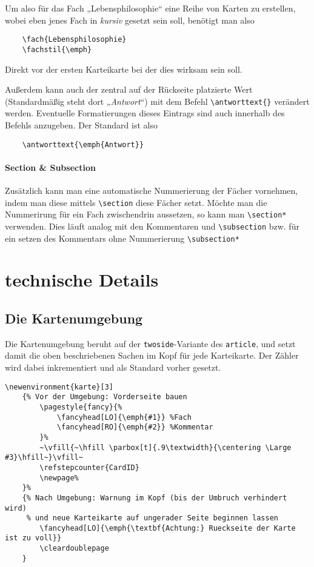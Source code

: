 \documentclass[a4paper]{article}
\begin{document}
Um also für das Fach „Lebensphilosophie“ eine Reihe von Karten zu erstellen, wobei eben jenes Fach in \emph{kursiv} gesetzt sein soll, benötigt man also
\begin{lstlisting}
	\fach{Lebensphilosophie}
	\fachstil{\emph}
\end{lstlisting}
Direkt vor der ersten Karteikarte bei der dies wirksam sein soll.

Außerdem kann auch der zentral auf der Rückseite platzierte Wert (Standardmäßig steht dort „\emph{Antwort}“) mit dem Befehl \lstinline!\antworttext{}! verändert werden. Eventuelle Formatierungen dieses Eintrags sind auch innerhalb des Befehls anzugeben. Der Standard ist also
\begin{lstlisting}
	\antworttext{\emph{Antwort}}
\end{lstlisting}

\paragraph{Section \& Subsection} Zusätzlich kann man eine automatische Nummerierung der Fächer vornehmen, indem man diese mittels \lstinline!\section! diese Fächer setzt. Möchte man die Nummerirung für ein Fach zwischendrin aussetzen, so kann man \lstinline!\section*! verwenden. Dies läuft analog mit den Kommentaren und \lstinline!\subsection! bzw. für ein setzen des Kommentars ohne Nummerierung \lstinline!\subsection*!
%
%
%
\section{technische Details}
\subsection{Die Kartenumgebung}
Die Kartenumgebung beruht auf der \lstinline!twoside!-Variante des \lstinline!article!, und setzt damit die oben beschriebenen Sachen im Kopf für jede Karteikarte. Der Zähler wird dabei inkrementiert und als Standard vorher gesetzt.
\begin{lstlisting}[title=Die Kartenumgebung]
\newenvironment{karte}[3]
	{% Vor der Umgebung: Vorderseite bauen
		\pagestyle{fancy}{% 
			\fancyhead[LO]{\emph{#1}} %Fach
			\fancyhead[RO]{\emph{#2}} %Kommentar
		}%
		~\vfill{~\hfill \parbox[t]{.9\textwidth}{\centering \Large #3}\hfill~}\vfill~
		\refstepcounter{CardID}
		\newpage%
	}%
	{% Nach Umgebung: Warnung im Kopf (bis der Umbruch verhindert wird) 
	 % und neue Karteikarte auf ungerader Seite beginnen lassen
		\fancyhead[LO]{\emph{\textbf{Achtung:} Rueckseite der Karte ist zu voll}}
		\cleardoublepage
	}
\end{lstlisting}
\end{document}
